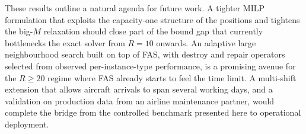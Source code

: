 These results outline a natural agenda for future work.  A tighter MILP
formulation that exploits the capacity-one structure of the positions
and tightens the big-$M$ relaxation should close part of the bound gap
that currently bottlenecks the exact solver from $R{=}10$ onwards.  An
adaptive large neighbourhood search built on top of FAS, with destroy
and repair operators selected from observed per-instance-type
performance, is a promising avenue for the $R{\ge}20$ regime where FAS
already starts to feel the time limit.  A multi-shift extension that
allows aircraft arrivals to span several working days, and a validation
on production data from an airline maintenance partner, would complete
the bridge from the controlled benchmark presented here to operational
deployment.
